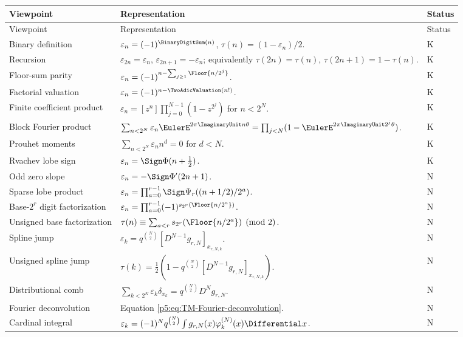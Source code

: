 \documentclass[11pt]{article}
\theoremstyle{definition}
\theoremstyle{remark}
\newcommand{\eps}{\varepsilon}
\newcommand{\statusknown}{\textsf{K}}
\newcommand{\statusnew}{\textsf{N}}
\begin{document}
\begin{longtable}{@{}p{}p{}p{}@{}}
\toprule
Viewpoint & Representation & Status\\
\midrule
\endfirsthead
\toprule
Viewpoint & Representation & Status\\
\midrule
\endhead
Binary definition &
$\eps_n=(-1)^{\BinaryDigitSum(n)}$, $\tau(n)=(1-\eps_n)/2$. & \statusknown\\
Recursion &
$\eps_{2n}=\eps_n$, $\eps_{2n+1}=-\eps_n$; equivalently
$\tau(2n)=\tau(n)$, $\tau(2n+1)=1-\tau(n)$. & \statusknown\\
Floor-sum parity &
$\eps_n=(-1)^{n-\sum_{j\ge1}\Floor{n/2^j}}$. & \statusknown\\
Factorial valuation &
$\eps_n=(-1)^{n-\TwoAdicValuation(n!)}$. & \statusknown\\
Finite coefficient product &
$\eps_n=[z^n]\prod_{j=0}^{N-1}(1-z^{2^j})$ for $n<2^N$. & \statusknown\\
Block Fourier product &
$\sum_{n<2^N}\eps_n\EulerE^{2\pi\ImaginaryUnit n\theta}
=\prod_{j<N}(1-\EulerE^{2\pi\ImaginaryUnit2^j\theta})$. & \statusknown\\
Prouhet moments &
$\sum_{n<2^N}\eps_nn^d=0$ for $d<N$. & \statusknown\\
Rvachev lobe sign &
$\eps_n=\Sign\Phi(n+\tfrac12)$. & \statusknown\\
Odd zero slope &
$\eps_n=-\Sign\Phi'(2n+1)$. & \statusnew\\
Sparse lobe product &
$\eps_n=\prod_{a=0}^{r-1}\Sign\Psi_r((n+1/2)/2^a)$. & \statusnew\\
Base-$2^r$ digit factorization &
$\eps_n=\prod_{a=0}^{r-1}(-1)^{s_{2^r}(\Floor{n/2^a})}$. & \statusnew\\
Unsigned base factorization &
$\tau(n)\equiv\sum_{a<r}s_{2^r}(\Floor{n/2^a})\pmod2$. & \statusnew\\
Spline jump &
$\eps_k=q^{\binom N2}[D^{N-1}g_{r,N}]_{x_{r,N,k}}$. & \statusnew\\
Unsigned spline jump &
$\tau(k)=\frac12(1-q^{\binom N2}[D^{N-1}g_{r,N}]_{x_{r,N,k}})$. & \statusnew\\
Distributional comb &
$\sum_{k<2^N}\eps_k\delta_{x_k}=q^{\binom N2}D^Ng_{r,N}$. & \statusnew\\
Fourier deconvolution &
Equation \eqref{p5:eq:TM-Fourier-deconvolution}. & \statusnew\\
Cardinal integral &
$\eps_k=(-1)^Nq^{\binom N2}\int g_{r,N}(x)\varphi_k^{(N)}(x)\Differential x$. & \statusnew\\

\end{longtable}
\end{document}

